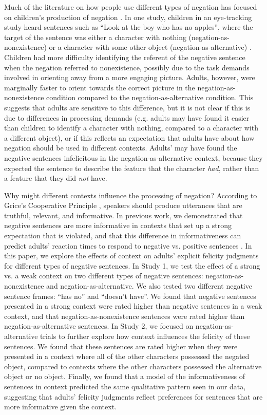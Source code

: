 \documentclass[10pt,letterpaper]{article}
\begin{document}
Much of the literature on how people use different types of negation has focused on children's production of negation \cite{bloom1970, pea1980, choi1988}.  In one study, children in an eye-tracking study heard sentences such as ``Look at the boy who has no apples'', where the target of the sentence was either a character with nothing (negation-as-nonexistence) or a character with some other object (negation-as-alternative) \cite{nordmeyer2013, nordmeyer2014b}.  Children had more difficulty identifying the referent of the negative sentence when the negation referred to nonexistence, possibly due to the task demands involved in orienting away from a more engaging picture.  Adults, however, were marginally faster to orient towards the correct picture in the negation-as-nonexistence condition compared to the negation-as-alternative condition.  This suggests that adults are sensitive to this difference, but it is not clear if this is due to differences in processing demands (e.g. adults may have found it easier than children to identify a character with nothing, compared to a character with a different object), or if this reflects an expectation that adults have about how negation should be used in different contexts.  Adults' may have found the negative sentences infelicitous in the negation-as-alternative context, because they expected the sentence to describe the feature that the character \emph{had}, rather than a feature that they did \emph{not} have.

Why might different contexts influence the processing of negation?  According to Grice's Cooperative Principle \cite{grice1975}, speakers should produce utterances that are truthful, relevant, and informative.  In previous work, we demonstrated that negative sentences are more informative in contexts that set up a strong expectation that is violated, and that this difference in informativeness can predict adults' reaction times to respond to negative vs. positive sentences \cite{nordmeyer2014}.  In this paper, we explore the effects of context on adults' explicit felicity judgments for different types of negative sentences.  In Study 1, we test the effect of a strong vs. a weak context on two different types of negative sentences: negation-as-nonexistence and negation-as-alternative.  We also tested two different negative sentence frames: ``has no'' and ``doesn't have''.  We found that negative sentences presented in a strong context were rated higher than negative sentences in a weak context, and that negation-as-nonexistence sentences were rated higher than negation-as-alternative sentences.  In Study 2, we focused on negation-as-alternative trials to further explore how context influences the felicity of these sentences.  We found that these sentences are rated higher when they were presented in a context where all of the other characters possessed the negated object, compared to contexts where the other characters possessed the alternative object or no object.  Finally, we found that a model of the informativeness of sentences in context predicted the same qualitative pattern seen in our data, suggesting that adults' felicity judgments reflect preferences for sentences that are more informative given the context.
\end{document}
